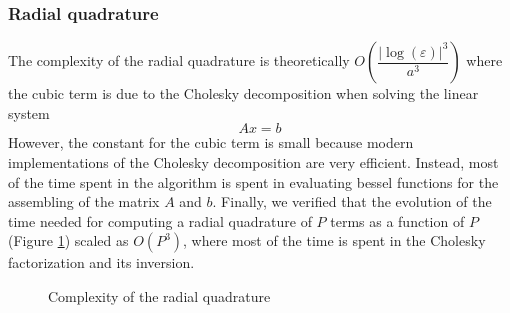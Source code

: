 \documentclass[11pt,a4paper]{article}
\begin{document}
\subsubsection*{Radial quadrature}

The complexity of the radial quadrature is theoretically $O\left( \dfrac{|\log(\varepsilon)|^3}{a^3}\right)$ where the cubic term is due to the Cholesky decomposition when solving the linear system
\[ Ax = b\]
However, the constant for the cubic term is small because modern implementations of the Cholesky decomposition are very efficient. Instead, most of the time spent in the algorithm is spent in evaluating bessel functions for the assembling of the matrix $A$ and $b$. 
Finally, we verified that the evolution of the time needed for computing a radial quadrature of $P$ terms as a function of $P$ (Figure \ref{ComplexQuadRad}) scaled as $O(P^3)$, where most of the time is spent in the Cholesky factorization and its inversion.  
 
\begin{figure}[H]
\centering

\label{ComplexQuadRad}
\caption{Complexity of the radial quadrature}
\end{figure}


 
\end{document}
